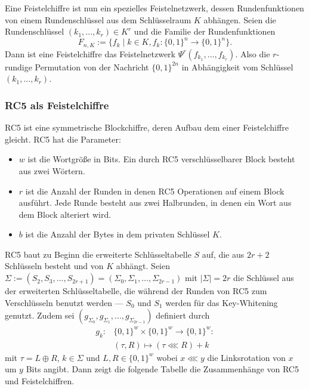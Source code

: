 \documentclass[course=erap]{aspdoc}
\begin{document}
Eine Feistelchiffre ist nun ein spezielles Feistelnetzwerk, dessen Rundenfunktionen von einem Rundenschlüssel aus dem Schlüsselraum $K$ abhängen.
Seien die Rundenschlüssel $(k_1, ..., k_r) \in K^r$ und die Familie der Rundenfunktionen
\[
    F_{n, K} := \{f_k \mid k \in K, f_k \colon \{0, 1\}^n \to \{0, 1\}^n\}.
\]
Dann ist eine Feistelchiffre das Feistelnetzwerk $\Psi^r(f_{k_1},...,f_{k_r})$. Also die $r$-rundige Permutation von der Nachricht $\{0, 1\}^{2n}$ in Abhängigkeit vom Schlüssel $(k_1, ..., k_r)$.\cite[p.14]{nachef}

\subsubsection{RC5 als Feistelchiffre}

RC5 ist eine symmetrische Blockchiffre, deren Aufbau dem einer Feistelchiffre gleicht. RC5 hat die Parameter:\cite[p.2f]{rc5rev}

\begin{itemize}
    \item $w$ ist die Wortgröße in Bits. Ein durch RC5 verschlüsselbarer Block besteht aus zwei Wörtern.
    \item $r$ ist die Anzahl der Runden in denen RC5 Operationen auf einem Block ausführt. Jede Runde besteht aus zwei Halbrunden, in denen ein Wort aus dem Block alteriert wird.
    \item $b$ ist die Anzahl der Bytes in dem privaten Schlüssel $K$.
\end{itemize}

RC5 baut zu Beginn die erweiterte Schlüsseltabelle $S$ auf, die aus $2r + 2$ Schlüsseln besteht und von $K$ abhängt. Seien $\Sigma := (S_2, S_3, ..., S_{2r+1}) = (\Sigma_0, \Sigma_1, ..., \Sigma_{2r-1})$ mit $|\Sigma| = 2r$ die Schlüssel aus der erweiterten Schlüsseltabelle, die während der Runden von RC5 zum Verschlüsseln benutzt werden --- $S_0$ und $S_1$ werden für das Key-Whitening genutzt. Zudem sei $(g_{\Sigma_0}, g_{\Sigma_1}, ..., g_{\Sigma_{2r-1}})$ definiert durch
\begin{align*}
    g_k \colon &\{0, 1\}^w \times \{0, 1\}^w \to \{0, 1\}^w \colon \\
               &(\tau, R) \mapsto (\tau \lll R) + k
\end{align*}
mit $\tau = L \oplus R$, $k \in \Sigma$ und $L, R \in \{0, 1\}^w$ wobei $x \lll y$ die Linksrotation von $x$ um $y$ Bits angibt. Dann zeigt die folgende Tabelle die Zusammenhänge von RC5 und Feistelchiffren.
\end{document}
